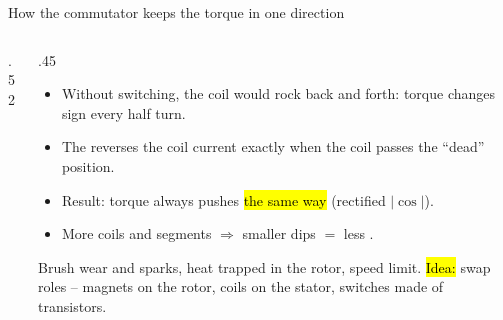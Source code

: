 \documentclass[aspectratio=169,10pt]{beamer}
\begin{document}
\begin{frame}{How the commutator keeps the torque in one direction}
\begin{columns}[T]
\begin{column}{.52\textwidth}
\end{column}
\begin{column}{.45\textwidth}
\small
\begin{itemize}\setlength\itemsep{2pt}
\item Without switching, the coil would rock back and forth: torque changes sign every half turn.
\item The  reverses the coil current exactly when the coil passes the ``dead'' position.
\item Result: torque always pushes \hl{the same way} (rectified $|\cos|$).
\item More coils and segments $\Rightarrow$ smaller dips $=$ less .
\end{itemize}
\begin{keybox}
\small
Brush wear and sparks, heat trapped in the rotor, speed limit. \hl{Idea:} swap roles -- magnets on the rotor, coils on the stator, switches made of transistors.
\end{keybox}
\end{column}
\end{columns}
\end{frame}
\end{document}
